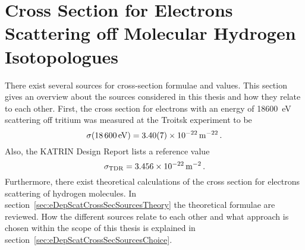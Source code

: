 \section{Cross Section for Electrons Scattering off Molecular Hydrogen Isotopologues}
\label{sec:eDepScatCrossSecSources}
There exist several sources for cross-section formulae and values. This section gives an overview about the sources considered in this thesis and how they relate to each other. First, the cross section for electrons with an energy of \SI{18600}{eV} scattering off tritium was measured at the Troitsk experiment to be~\cite{Aseev2000}
\begin{equation}
	\sigma(\SI{18600}{eV}) = \SI{3.40\pm0.07e-22}{m^{-22}} \fullstop
\end{equation}
Also, the KATRIN Design Report lists a reference value~\cite{Angrik:2005ep}
\begin{equation}
	\label{eq:eDepScatCrossSecSourcesCrossSecTDR}
	\sigma_\mathrm{TDR} = \SI{3.456e-22}{m^{-2}} \fullstop
\end{equation}
Furthermore, there exist theoretical calculations of the cross section for electrons scattering of hydrogen molecules. In section~\ref{sec:eDepScatCrossSecSourcesTheory} the theoretical formulae are reviewed. How the different sources relate to each other and what approach is chosen within the scope of this thesis is explained in section~\ref{sec:eDepScatCrossSecSourcesChoice}.
